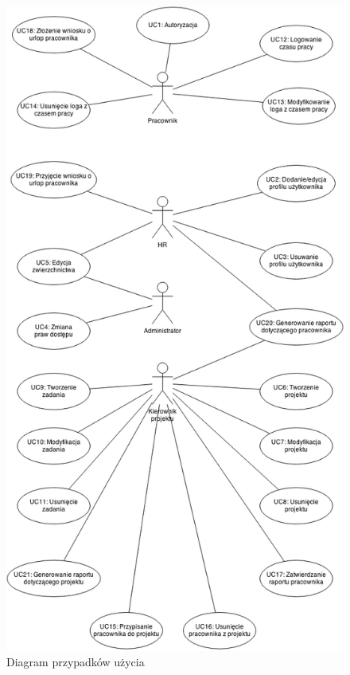 \begin{figure}[h]
    \centering
    \includegraphics[scale=0.5]{diagramy/usecases/usecases.png}
    \caption{Diagram przypadków użycia}
    \label{fig:usecase}
\end{figure}

